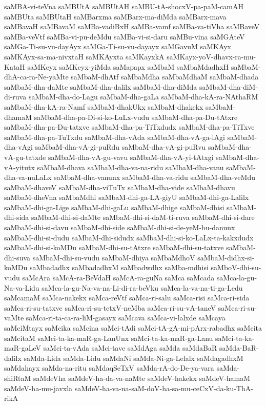 {saMBA-vi-teVna
saMBUtA
saMBUtAH
saMBU-tA-shocxV-pa-paM-camAH
saMBUta
saMBUtaH
saMBarxma
saMBarx-ma-diMda
saMBarx-mava
saMBavaH
saMBavaM
saMBa-vadiBxH
saMBa-vamf
saMBa-va-tiVha
saMBaveV
saMBa-veVtf
saMBa-vi-pu-deMdu
saMBa-vi-si-daru
saMBu-vina
saMGAteV
saMGa-Ti-su-vu-dayAyx
saMGa-Ti-su-vu-dayayx
saMGavuM
saMKAyx
saMKAyx-sa-ma-nivxtaH
saMKAyxta
saMKayxkA
saMKayx-yoV-dhavx-ra-mu-KataH
saMKeyx
saMKeyx-yiMda
saMapapx
saMbaM
saMbaMdadhxH
saMbaM-dhA-ca-ra-Ne-yaMte
saMbaM-dhAtf
saMbaMdha
saMbaMdhaM
saMbaM-dhada
saMbaM-dha-daMte
saMbaM-dha-dalilx
saMbaM-dha-diMda
saMbaM-dha-diM-di-ruva
saMbaM-dha-do-Lagu
saMbaM-dha-gaLa
saMbaM-dha-kA-ra-NAthaRM
saMbaM-dha-kA-ra-Namf
saMbaM-dhakUkx
saMbaM-dhakekx
saMbaM-dhamaM
saMbaM-dha-pa-Di-si-ko-LuLx-vudu
saMbaM-dha-pa-Du-tAtxre
saMbaM-dha-pa-Du-tatxve
saMbaM-dha-pa-TiTxdudx
saMbaM-dha-pa-TiTxve
saMbaM-dha-pa-TuTxdu
saMbaM-dha-vAda
saMbaM-dha-vA-ga-lAgi
saMbaM-dha-vAgi
saMbaM-dha-vA-gi-puRdu
saMbaM-dha-vA-gi-puRvu
saMbaM-dha-vA-gu-tatxde
saMbaM-dha-vA-gu-vavu
saMbaM-dha-vA-yi-tAtxgi
saMbaM-dha-vA-yitutx
saMbaM-dhava
saMbaM-dha-va-na-ridu
saMbaM-dha-vanu
saMbaM-dha-va-nuLaLx
saMbaM-dha-vanunx
saMbaM-dha-va-ridu
saMbaM-dha-veMdu
saMbaM-dhaveV
saMbaM-dha-viTuTx
saMbaM-dha-vide
saMbaM-dhavu
saMbaM-dheVna
saMbaMdhi
saMbaM-dhi-ga-LA-giyU
saMbaM-dhi-ga-Lalilx
saMbaM-dhi-ga-Lige
saMbaM-dhi-gaLu
saMbaM-dhige
saMbaM-dhisi
saMbaM-dhi-sida
saMbaM-dhi-si-daMte
saMbaM-dhi-si-daM-ti-ruva
saMbaM-dhi-si-dare
saMbaM-dhi-si-davu
saMbaM-dhi-side
saMbaM-dhi-si-de-yeM-bu-danunx
saMbaM-dhi-si-dudu
saMbaM-dhi-sidudx
saMbaM-dhi-si-ko-LaLx-ta-kakxdudx
saMbaM-dhi-si-koMDu
saMbaM-dhi-su-tAtxre
saMbaM-dhi-su-tatxve
saMbaM-dhi-suva
saMbaM-dhi-su-vudu
saMbaM-dhiya
saMbaMdhoV
saMbaM-didhx-si-koMDu
saMbadadhx
saMbadadhxM
saMbadwdhx
saMba-mdhisi
saMboV-dhi-su-vudu
saMcAra
saMcA-ra-BeVdaH
saMcA-ra-guNa
saMca
saMcada
saMca-la-gu-Na-va-Lidu
saMca-la-gu-Na-va-na-Li-di-ra-beVku
saMca-la-va-na-ti-ga-Ledu
saMcamaM
saMca-nakekx
saMca-reVtf
saMca-ri-salu
saMca-risi
saMca-ri-sida
saMca-ri-su-tatxve
saMca-ri-su-tetxV-neMba
saMca-ri-su-vA-taneV
saMca-ri-su-vaMte
saMca-ri-ta-ca-ra-liM-gasayx
saMcava
saMca-vi-lalxde
saMcaya
saMciMtayx
saMcika
saMcina
saMci-tAdi
saMci-tA-gA-mi-pArx-rabadhx
saMcita
saMcitaM
saMci-ta-ka-maR-ga-LanUnx
saMci-ta-ka-maR-ga-Lanu
saMci-ta-ka-maR-gaLeV
saMci-ta-vAda
saMci-tave
saMdAga
saMda
saMdaBaR
saMda-BaR-dalilx
saMda-Lida
saMda-Lidu
saMdaNi
saMda-Ni-ga-Lelalx
saMdagadhxM
saMdahayx
saMda-na-ritu
saMdaqSeTxV
saMda-rA-do-De-ya-vara
saMda-shiRtaM
saMdeVha
saMdeV-ha-da-va-naMte
saMdeV-hakekx
saMdeV-hamaM
saMdeV-ha-mu-javxla
saMdeV-ha-va-na-saM-doV-ha-sa-mu-ceCxV-da-ku-ThA-rikA
}
